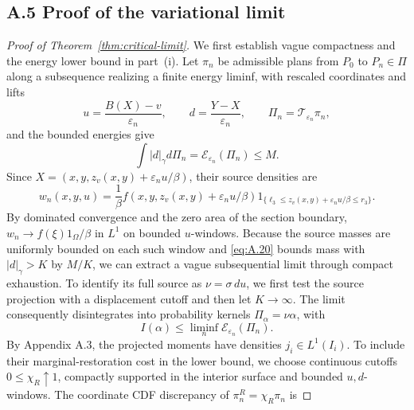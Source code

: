 \subsection{A.5 Proof of the variational limit}\label{app:variational-proof}

\begin{proof}[Proof of Theorem~\ref{thm:critical-limit}]
\label{step:compactness}
We first establish vague compactness and the energy lower bound in part~(i). Let \(\pi_n\) be admissible plans from \(P_0\) to \(P_n\in\Pi\) along a subsequence realizing a finite energy liminf, with rescaled coordinates and lifts
\begin{equation}
u=\frac{B(X)-v}{\varepsilon_n},\qquad
d=\frac{Y-X}{\varepsilon_n},\qquad
\Pi_n=\mathscr T_{\varepsilon_n}\pi_n,
\tag{A.19}\label{eq:A.19}
\end{equation}
and the bounded energies give
\begin{equation}
\int|d|_\gamma d\Pi_n=\mathcal E_{\varepsilon_n}(\Pi_n)\le M.
\tag{A.20}\label{eq:A.20}
\end{equation}
\label{proof:full-source-kernel}
Since \(X=(x,y,z_v(x,y)+\varepsilon_nu/\beta)\), their source densities are
\begin{equation}
w_n(x,y,u)=\frac1\beta f(x,y,z_v(x,y)+\varepsilon_nu/\beta)
1_{\{\ell_3\le z_v(x,y)+\varepsilon_nu/\beta\le r_3\}}.
\tag{A.21}\label{eq:A.21}
\end{equation}
By dominated convergence and the zero area of the section boundary, \(w_n\to f(\xi)1_\Omega/\beta\) in \(L^1\) on bounded \(u\)-windows. Because the source masses are uniformly bounded on each such window and \eqref{eq:A.20} bounds mass with \(|d|_\gamma>K\) by \(M/K\), we can extract a vague subsequential limit through compact exhaustion. To identify its full source as \(\nu=\sigma\,du\), we first test the source projection with a displacement cutoff and then let \(K\to\infty\). The limit consequently disintegrates into probability kernels \(\Pi_\alpha=\nu\alpha\), with
\begin{equation}
I(\alpha)\le\liminf_n\mathcal E_{\varepsilon_n}(\Pi_n).
\tag{A.22}\label{eq:A.22}
\end{equation}
By Appendix A.3, the projected moments have densities \(j_i\in L^1(I_i)\). To include their marginal-restoration cost in the lower bound, we choose continuous cutoffs \(0\le\chi_R\uparrow1\), compactly supported in the interior surface and bounded \(u,d\)-windows.
\label{step:compensation-cost}
The coordinate CDF discrepancy of \(\pi_n^R=\chi_R\pi_n\) is

\end{proof}
